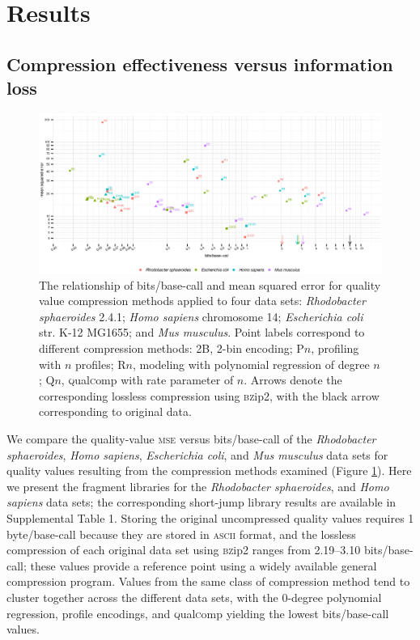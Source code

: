 \documentclass{bioinfo}
\begin{document}
\section{Results}

\subsection{Compression effectiveness versus information loss}

\begin{figure}[!tb]
\centerline{\includegraphics[width=7in]{compression_results.eps}}
\caption{The relationship of bits/base-call and mean squared error for
  quality value compression methods applied to four data sets:
  \textit{Rhodobacter sphaeroides} 2.4.1; \textit{Homo sapiens}
  chromosome 14; \textit{Escherichia coli} str. K-12 MG1655; and
  \textit{Mus musculus}. Point labels correspond to different
  compression methods: 2B, 2-bin encoding; P$n$, profiling with $n$
  profiles; R$n$, modeling with polynomial regression of degree $n$;
  Q$n$, \textsc{q}ual\textsc{c}omp with rate parameter of $n$. Arrows
  denote the corresponding lossless compression using \textsc{bz}ip2,
  with the black arrow corresponding to original data.}
\label{fig:mse_vs_bpbp}
\end{figure}

We compare the quality-value \textsc{mse} versus bits/base-call of the
\textit{Rhodobacter sphaeroides}, \textit{Homo sapiens},
\textit{Escherichia coli}, and \textit{Mus musculus} data sets for
quality values resulting from the compression methods examined (Figure
\ref{fig:mse_vs_bpbp}). Here we present the fragment libraries for the
\textit{Rhodobacter sphaeroides}, and \textit{Homo sapiens} data sets;
the corresponding short-jump library results are available in
Supplemental Table 1. Storing the original uncompressed quality values
requires 1 byte/base-call because they are stored in \textsc{ascii}
format, and the lossless compression of each original data set using
\textsc{bz}ip2 ranges from 2.19--3.10 bits/base-call; these values
provide a reference point using a widely available general compression
program. Values from the same class of compression method tend to
cluster together across the different data sets, with the 0-degree
polynomial regression, profile encodings, and
\textsc{q}ual\textsc{c}omp yielding the lowest bits/base-call values.
\end{document}
